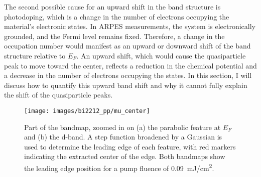 The second possible cause for an upward shift in the band structure is photodoping, which is a change in the number of electrons occupying the material’s electronic states.
In ARPES measurements, the system is electronically grounded, and the Fermi level remains fixed.
Therefore, a change in the occupation number would manifest as an upward or downward shift of the band structure relative to $E_F$.
An upward shift, which would cause the quasiparticle peak to move toward the center, reflects a reduction in the chemical potential and a decrease in the number of electrons occupying the states.
In this section, I will discuss how to quantify this upward band shift and why it cannot fully explain the shift of the quasiparticle peaks.

\begin{figure}[b!]
	\centering
	\texttt{[image: images/bi2212\_pp/mu\_center]}
	\caption{Part of the bandmap, zoomed in on (a) the parabolic feature at $E_F$ and (b) the  d-band. A step function broadened by a Gaussian is used to determine the leading edge of each feature, with red markers indicating the extracted center of the edge. Both bandmaps show the leading edge position for a pump fluence of \qty{0.09}{\milli\joule/\centi\meter\squared}.}
	\label{fig:mu_center}
\end{figure}


